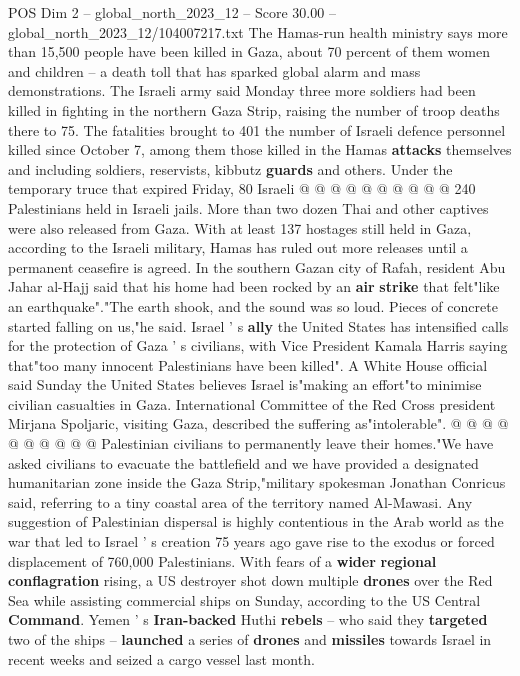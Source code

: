 \begin{textsample}{POS Dim 2 – global\_north\_2023\_12 – Score 30.00 – global\_north\_2023\_12/104007217.txt}
The Hamas-run health ministry says more than 15,500 people have been killed in Gaza, about 70 percent of them women and children -- a death toll that has sparked global alarm and mass demonstrations.
The Israeli army said Monday three more soldiers had been killed in fighting in the northern Gaza Strip, raising the number of troop deaths there to 75.
The fatalities brought to 401 the number of Israeli defence personnel killed since October 7, among them those killed in the Hamas \textbf{attacks} themselves and including soldiers, reservists, kibbutz \textbf{guards} and others.
Under the temporary truce that expired Friday, 80 Israeli @ @ @ @ @ @ @ @ @ @ 240 Palestinians held in Israeli jails.
More than two dozen Thai and other captives were also released from Gaza.
With at least 137 hostages still held in Gaza, according to the Israeli military, Hamas has ruled out more releases until a permanent ceasefire is agreed.
In the southern Gazan city of Rafah, resident Abu Jahar al-Hajj said that his home had been rocked by an \textbf{air} \textbf{strike} that felt"like an earthquake"."The earth shook, and the sound was so loud.
Pieces of concrete started falling on us,"he said.
Israel ' s \textbf{ally} the United States has intensified calls for the protection of Gaza ' s civilians, with Vice President Kamala Harris saying that"too many innocent Palestinians have been killed".
A White House official said Sunday the United States believes Israel is"making an effort"to minimise civilian casualties in Gaza.
International Committee of the Red Cross president Mirjana Spoljaric, visiting Gaza, described the suffering as"intolerable". @ @ @ @ @ @ @ @ @ @ Palestinian civilians to permanently leave their homes."We have asked civilians to evacuate the battlefield and we have provided a designated humanitarian zone inside the Gaza Strip,"military spokesman Jonathan Conricus said, referring to a tiny coastal area of the territory named Al-Mawasi.
Any suggestion of Palestinian dispersal is highly contentious in the Arab world as the war that led to Israel ' s creation 75 years ago gave rise to the exodus or forced displacement of 760,000 Palestinians.
With fears of a \textbf{wider} \textbf{regional} \textbf{conflagration} rising, a US destroyer shot down multiple \textbf{drones} over the Red Sea while assisting commercial ships on Sunday, according to the US Central \textbf{Command}.
Yemen ' s \textbf{Iran-backed} Huthi \textbf{rebels} -- who said they \textbf{targeted} two of the ships -- \textbf{launched} a series of \textbf{drones} and \textbf{missiles} towards Israel in recent weeks and seized a cargo vessel last month.

\end{textsample}
